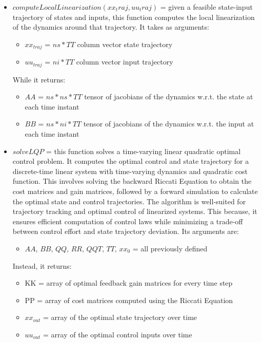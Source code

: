\documentclass[a4paper,11pt,oneside]{book}
\begin{document}
\begin{itemize}
    \item $computeLocalLinearization(xx_traj, uu_traj)$ = given a feasible state-input trajectory of states and inputs, this function computes the local linearization of the dynamics around that trajectory. It takes as arguments:
    \begin{itemize}
        \item $xx_{traj}$ = $ns*TT$ column vector state trajectory
        \item $uu_{traj}$ = $ni*TT$ column vector input trajectory
    \end{itemize}
    While it returns:
    \begin{itemize}
        \item $AA$ = $ns*ns*TT$ tensor of jacobians of the dynamics w.r.t. the state at each time instant
        \item $BB$ = $ns*ni*TT$ tensor of jacobians of the dynamics w.r.t. the input at each time instant
    \end{itemize}
    \item $solveLQP$ = this function solves a time-varying linear quadratic optimal control problem. It computes the optimal control and state trajectory for a discrete-time linear system with time-varying dynamics and quadratic cost function. This involves solving the backward Riccati Equation to obtain the cost matrices and gain matrices, followed by a forward simulation to calculate the optimal state and control trajectories. The algorithm is well-suited for trajectory tracking and optimal control of linearized systems. This because, it ensures efficient computation of control laws while minimizing a trade-off between control effort and state trajectory deviation. Its arguments are:
    \begin{itemize}
        \item $AA$, $BB$, $QQ$, $RR$, $QQT$, $TT$, $xx_{0}$ = all previously defined 
    \end{itemize}
    Instead, it returns:
    \begin{itemize}
        \item KK = array of optimal feedback gain matrices for every time step
        \item PP = array of cost matrices computed using the Riccati Equation
        \item $xx_{out}$ = array of the optimal state trajectory over time
        \item $uu_{out}$ =  array of the optimal control inputs over time 

\end{itemize}
\end{itemize}
\end{document}
